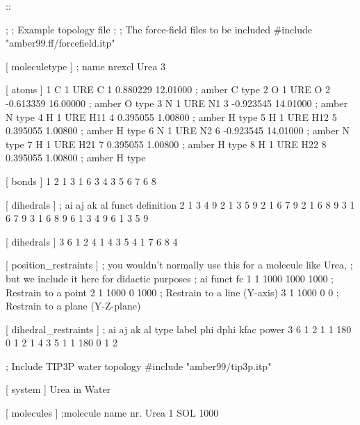 ::

    ;
    ;       Example topology file
    ;
    ; The force-field files to be included
    #include "amber99.ff/forcefield.itp"

    [ moleculetype ]
    ; name  nrexcl
    Urea         3

    [ atoms ]
       1  C  1  URE      C      1     0.880229  12.01000   ; amber C  type
       2  O  1  URE      O      2    -0.613359  16.00000   ; amber O  type
       3  N  1  URE     N1      3    -0.923545  14.01000   ; amber N  type
       4  H  1  URE    H11      4     0.395055   1.00800   ; amber H  type
       5  H  1  URE    H12      5     0.395055   1.00800   ; amber H  type
       6  N  1  URE     N2      6    -0.923545  14.01000   ; amber N  type
       7  H  1  URE    H21      7     0.395055   1.00800   ; amber H  type
       8  H  1  URE    H22      8     0.395055   1.00800   ; amber H  type

    [ bonds ]
        1	2
        1	3	
        1   6
        3	4
        3	5
        6	7
        6	8

    [ dihedrals ] 
    ;   ai    aj    ak    al funct  definition
         2     1     3     4   9     
         2     1     3     5   9     
         2     1     6     7   9     
         2     1     6     8   9     
         3     1     6     7   9     
         3     1     6     8   9     
         6     1     3     4   9     
         6     1     3     5   9     

    [ dihedrals ] 
         3     6     1     2   4     
         1     4     3     5   4	 
         1     7     6     8   4

    [ position_restraints ]
    ; you wouldn't normally use this for a molecule like Urea,
    ; but we include it here for didactic purposes
    ; ai   funct    fc
       1     1     1000    1000    1000 ; Restrain to a point
       2     1     1000       0    1000 ; Restrain to a line (Y-axis)
       3     1     1000       0       0 ; Restrain to a plane (Y-Z-plane)

    [ dihedral_restraints ]
    ; ai   aj    ak    al  type  label  phi  dphi  kfac  power
        3    6     1    2     1      1  180     0     1      2
        1    4     3    5     1      1  180     0     1      2

    ; Include TIP3P water topology
    #include "amber99/tip3p.itp"

    [ system ]
    Urea in Water

    [ molecules ]
    ;molecule name   nr.
    Urea             1
    SOL              1000

